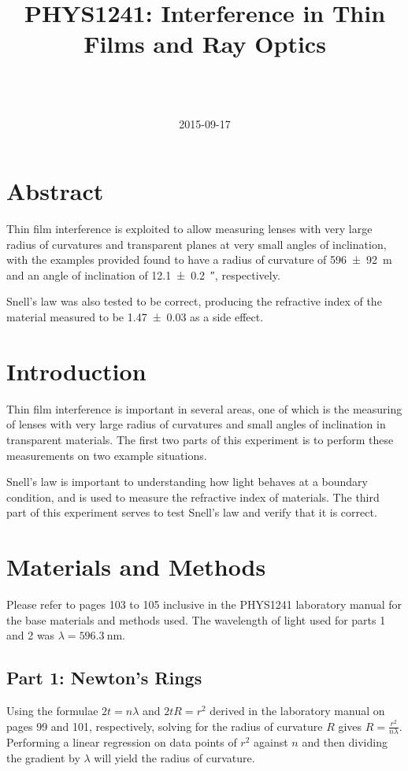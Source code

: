 \documentclass[a4paper]{scrartcl}
\begin{document}
\title{PHYS1241: Interference in Thin Films and Ray Optics}
\author{ \\ \\ }
\date{2015-09-17}
\maketitle

\section{Abstract}
Thin film interference is exploited to allow measuring lenses with very large radius of curvatures and transparent planes at very small angles of inclination, with the examples provided found to have a radius of curvature of \SI{596 \pm 92}{\metre} and an angle of inclination of \SI{12.1 \pm 0.2}{\arcsecond}, respectively.

Snell's law was also tested to be correct, producing the refractive index of the material measured to be \SI{1.47 \pm 0.03}{} as a side effect.

\section{Introduction}
Thin film interference is important in several areas, one of which is the measuring of lenses with very large radius of curvatures and small angles of inclination in transparent materials. The first two parts of this experiment is to perform these measurements on two example situations.

Snell's law is important to understanding how light behaves at a boundary condition, and is used to measure the refractive index of materials. The third part of this experiment serves to test Snell's law and verify that it is correct.

\section{Materials and Methods}
Please refer to pages 103 to 105 inclusive in the PHYS1241 laboratory manual for the base materials and methods used. The wavelength of light used for parts 1 and 2 was \(\lambda = \SI{596.3}{\nano\metre}\).

\subsection{Part 1: Newton's Rings}
Using the formulae \(2 t = n \lambda\) and \(2 t R = r^2\) derived in the laboratory manual on pages 99 and 101, respectively, solving for the radius of curvature \(R\) gives \(R = \frac{r^2}{n \lambda}\). Performing a linear regression on data points of \(r^2\) against \(n\) and then dividing the gradient by \(\lambda\) will yield the radius of curvature.
\end{document}
